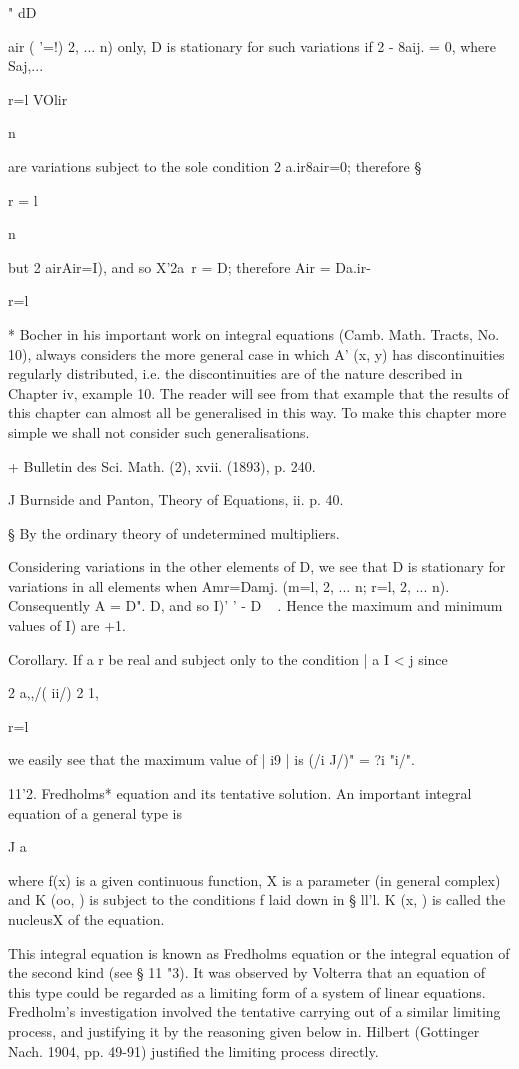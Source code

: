 " dD

air ( '=!) 2, ... n) only, D is stationary for such variations if 2 -
8aij. = 0, where Saj,...

r=l VOlir

n

are variations subject to the sole condition 2 a.ir8air=0; therefore
§

r = l

n

but 2 airAir=I), and so X'2a\ r = D; therefore Air = Da.ir-

r=l

* Bocher in his important work on integral equations (Camb. Math.
Tracts, No. 10), always considers the more general case in which A'
(x, y) has discontinuities regularly distributed, i.e. the
discontinuities are of the nature described in Chapter iv, example 10.
The reader will see from that example that the results of this chapter
can almost all be generalised in this way. To make this chapter more
simple we shall not consider such generalisations.

+ Bulletin des Sci. Math. (2), xvii. (1893), p. 240.

J Burnside and Panton, Theory of Equations, ii. p. 40.

§ By the ordinary theory of undetermined multipliers.

%
%

Considering variations in the other elements of D, we see that D is
stationary for variations in all elements when Amr=Damj. (m=l, 2, ...
n; r=l, 2, ... n). Consequently A = D". D, and so I)' ' - D ~ . Hence
the maximum and minimum values of I) are +1.

Corollary. If a r be real and subject only to the condition | a I < j
since

2 a,,/( ii/) 2 1,

r=l

we easily see that the maximum value of | i9 | is (/i J/)" = ?i "i/".

11'2. Fredholms* equation and its tentative solution. An important
integral equation of a general type is

J a

where f(x) is a given continuous function, X is a parameter (in
general complex) and K (oo, ) is subject to the conditions f laid down
in § ll'l. K (x, ) is called the nucleusX of the equation.

This integral equation is known as Fredholms equation or the integral
equation of the second kind (see § 11 "3). It was observed by Volterra
that an equation of this type could be regarded as a limiting form of
a system of linear equations. Fredholm's investigation involved the
tentative carrying out of a similar limiting process, and justifying
it by the reasoning given below in. Hilbert (Gottinger Nach.
1904, pp. 49-91) justified the limiting process directly.


